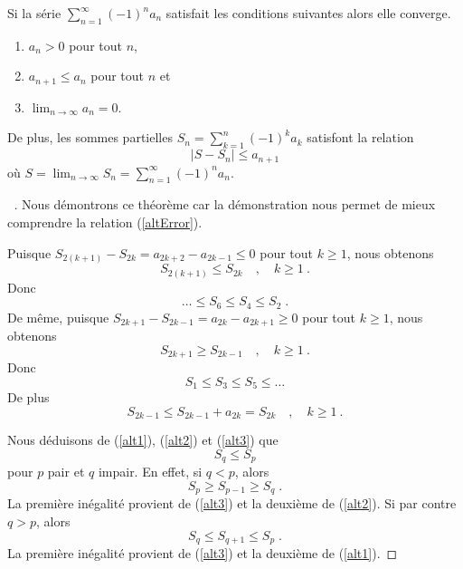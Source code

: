 {\begin{theorem}
Si la série $\displaystyle \sum_{n=1}^\infty (-1)^n a_n$ satisfait les
conditions suivantes alors elle converge.
\begin{enumerate}
\item $a_n >0$ pour tout $n$,
\item $a_{n+1} \leq a_n$ pour tout $n$ et
\item $\displaystyle \lim_{n\rightarrow \infty} a_n = 0$.
\end{enumerate}
De plus, les sommes partielles
$\displaystyle S_n = \sum_{k=1}^n (-1)^k a_k$ satisfont la relation
\begin{equation}\label{altError}
 | S - S_n | \leq a_{n+1}
\end{equation}
où $\displaystyle S = \lim_{n\rightarrow \infty} S_n
= \sum_{n=1}^\infty (-1)^n a_n$.
\label{altTest}
\end{theorem}

\begin{proof}[\UOproof\ \theory]
Nous démontrons ce théorème car la démonstration nous permet de mieux
comprendre la relation (\ref{altError}).

Puisque $S_{2(k+1)} - S_{2k} = a_{2k+2} - a_{2k-1} \leq 0$ pour tout
$k\geq 1$, nous obtenons
\begin{equation}\label{alt1}
S_{2(k+1)} \leq S_{2k} \quad , \quad k\geq 1 \ .
\end{equation}
Donc
\[
\ldots \leq S_6 \leq S_4 \leq S_2 \; .
\]
De même, puisque $S_{2k+1} - S_{2k-1} = a_{2k} - a_{2k+1} \geq 0$ pour
tout $k\geq 1$, nous obtenons
\begin{equation}\label{alt2}
S_{2k+1} \geq S_{2k-1} \quad , \quad  k\geq 1 \ .
\end{equation}
Donc
\[
S_1 \leq S_3 \leq S_5 \leq \ldots
\]
De plus
\begin{equation}\label{alt3}
S_{2k-1} \leq S_{2k-1} + a_{2k} = S_{2k} \quad , \quad k \geq 1 \ .
\end{equation}

Nous déduisons de (\ref{alt1}), (\ref{alt2}) et (\ref{alt3}) que
\begin{equation}\label{alt4}
S_q \leq S_p
\end{equation}
pour $p$ pair et $q$ impair.  En effet, si $q < p$, alors
\[
S_p \geq S_{p-1} \geq S_q \; .
\]
La première inégalité provient de (\ref{alt3}) et la deuxième de
(\ref{alt2}).  Si par contre $q>p$, alors
\[
S_q \leq S_{q+1} \leq S_p \; .
\]
La première inégalité provient de (\ref{alt3}) et la deuxième de
(\ref{alt1}).


\end{proof}}
